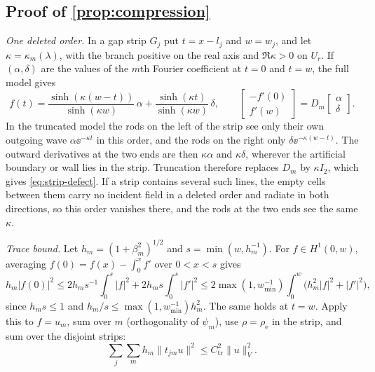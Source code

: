 \subsection{Proof of \texorpdfstring{\cref{prop:compression}}{the compression proposition}}
\emph{One deleted order.} In a gap strip $G_j$ put $t=x-l_j$ and $w=w_j$, and
let $\kappa=\kappa_m(\lambda)$, with the branch positive on the real axis and
$\Re\kappa>0$ on $U_r$. If $(\alpha,\delta)$ are the values of the $m$th Fourier
coefficient at $t=0$ and $t=w$, the full model gives
\[
  f(t)=\frac{\sinh(\kappa(w-t))}{\sinh(\kappa w)}\,\alpha
       +\frac{\sinh(\kappa t)}{\sinh(\kappa w)}\,\delta,\qquad
  \begin{bmatrix}-f'(0)\\ f'(w)\end{bmatrix}=D_m\begin{bmatrix}\alpha\\ \delta\end{bmatrix}.
\]
In the truncated model the rods on the left of the strip see only their own
outgoing wave $\alpha\ee^{-\kappa t}$ in this order, and the rods on the right
only $\delta\ee^{-\kappa(w-t)}$. The outward derivatives at the two ends are
then $\kappa\alpha$ and $\kappa\delta$, wherever the artificial boundary or wall lies in the strip.
Truncation therefore replaces $D_m$ by $\kappa I_2$, which gives
\eqref{eq:strip-defect}. If a strip contains several such lines, the empty cells
between them carry no incident field in a deleted order and radiate in both
directions, so this order vanishes there, and the rods at the two ends see the
same $\kappa$.

\emph{Trace bound.} Let $h_m=(1+\beta_m^2)^{1/2}$ and $s=\min(w,h_m^{-1})$. For
$f\in H^1(0,w)$, averaging $f(0)=f(x)-\int_0^xf'$ over $0<x<s$ gives
\[
  h_m|f(0)|^2\le2h_ms^{-1}\int_0^s|f|^2+2h_ms\int_0^s|f'|^2
  \le2\max(1,w_{\min}^{-1})\int_0^w\bigl(h_m^2|f|^2+|f'|^2\bigr),
\]
since $h_ms\le1$ and $h_m/s\le\max(1,w_{\min}^{-1})h_m^2$. The same holds at
$t=w$. Apply this to $f=u_m$, sum over $m$ (orthogonality of $\psi_m$), use
$\rho=\rho_{\mathrm e}$ in the strip, and sum over the disjoint strips:
\begin{equation}\label{eq:app-trace}
  \sum_j\sum_mh_m\|t_{jm}u\|^2\le C_{\mathrm{tr}}^2\|u\|_V^2 .
\end{equation}

